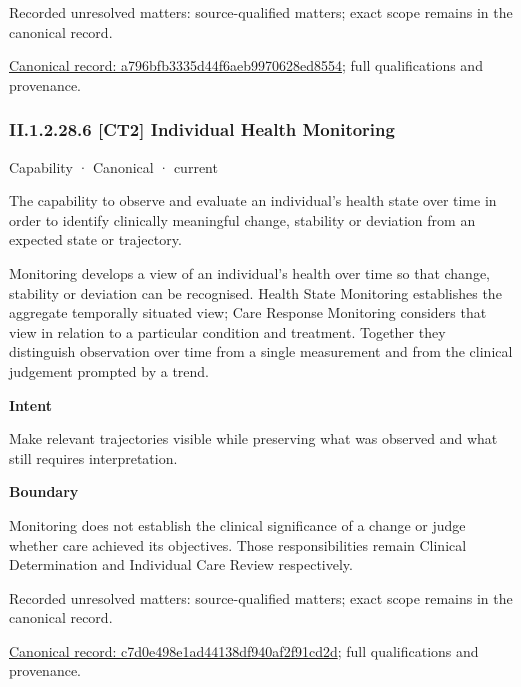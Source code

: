 {\small Recorded unresolved matters: source-qualified matters; exact scope remains in the canonical record.}\par
{\footnotesize \href{../../../../continuum/strategy/capability/a796bfb3335d44f6aeb9970628ed8554.md}{Canonical record: a796bfb3335d44f6aeb9970628ed8554}; full qualifications and provenance.}\par
\subsubsection*{II.1.2.28.6 [CT2] Individual Health Monitoring}
\label{navigation:II.1.2.28.6}

\label{element:c7d0e498e1ad44138df940af2f91cd2d}
{\small Capability · Canonical · current}\par

The capability to observe and evaluate an individual's health state over time in order to identify clinically meaningful change, stability or deviation from an expected state or trajectory.



Monitoring develops a view of an individual's health over time so that change, stability or deviation can be recognised. Health State Monitoring establishes the aggregate temporally situated view; Care Response Monitoring considers that view in relation to a particular condition and treatment. Together they distinguish observation over time from a single measurement and from the clinical judgement prompted by a trend.



\textbf{Intent}



Make relevant trajectories visible while preserving what was observed and what still requires interpretation.



\textbf{Boundary}



Monitoring does not establish the clinical significance of a change or judge whether care achieved its objectives. Those responsibilities remain Clinical Determination and Individual Care Review respectively.


{\small Recorded unresolved matters: source-qualified matters; exact scope remains in the canonical record.}\par
{\footnotesize \href{../../../../continuum/strategy/capability/c7d0e498e1ad44138df940af2f91cd2d.md}{Canonical record: c7d0e498e1ad44138df940af2f91cd2d}; full qualifications and provenance.}\par
